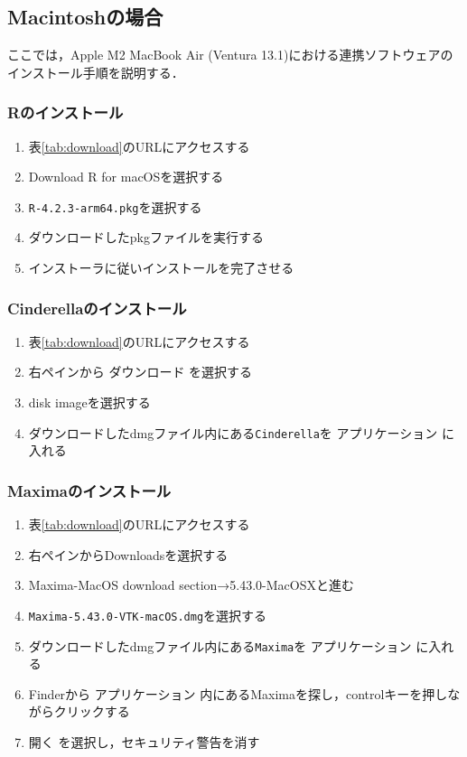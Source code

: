 \newpage

\subsection{Macintoshの場合}

ここでは，Apple M2 MacBook Air (Ventura 13.1)における連携ソフトウェアのインストール手順を説明する．

\subsubsection{Rのインストール}
\begin{enumerate}
    \item 表\ref{tab:download}のURLにアクセスする
    \item Download R for macOSを選択する
    \item \verb|R-4.2.3-arm64.pkg|を選択する
    \item ダウンロードしたpkgファイルを実行する
    \item インストーラに従いインストールを完了させる
\end{enumerate}

\subsubsection{Cinderellaのインストール}
\begin{enumerate}
    \item 表\ref{tab:download}のURLにアクセスする
    \item 右ペインから ダウンロード を選択する
    \item disk imageを選択する
    \item ダウンロードしたdmgファイル内にある\verb|Cinderella|を アプリケーション に入れる
\end{enumerate}

\subsubsection{Maximaのインストール}
\begin{enumerate}
    \item 表\ref{tab:download}のURLにアクセスする
    \item 右ペインからDownloadsを選択する
    \item Maxima-MacOS download section→5.43.0-MacOSXと進む
    \item \verb|Maxima-5.43.0-VTK-macOS.dmg|を選択する
    \item ダウンロードしたdmgファイル内にある\verb|Maxima|を アプリケーション に入れる
    \item Finderから アプリケーション 内にあるMaximaを探し，controlキーを押しながらクリックする
    \item 開く を選択し，セキュリティ警告を消す
\end{enumerate}

